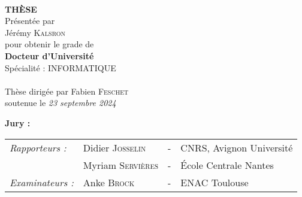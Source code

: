 

\begin{titlepage}
\begin{center}
 \\
\vspace*{0.1cm}
\vspace*{0.1cm}
\vspace*{0.1cm}

\vspace*{0.5cm}
\noindent \Huge \textbf{THÈSE} \\
\vspace*{0.3cm}
\noindent \large {Présentée par\\}
\noindent \LARGE Jérémy \textsc{Kalsron} \\
\vspace*{0.8cm}
\noindent \large {pour obtenir le grade de} \\
\noindent \LARGE \textbf{Docteur d'Université} \\
\vspace*{0.3cm}
\noindent \large {Spécialité : INFORMATIQUE} \\
\vspace*{0.8cm}
 \\
\vspace*{0.8cm}
\noindent \Large Thèse dirigée par Fabien \textsc{Feschet} \\
\vspace*{0.2cm}
\noindent \large soutenue le \textit{23 septembre 2024} \\
\vspace*{0.2cm}
\end{center}
\noindent \large \textbf{Jury :}
\begin{center}
\noindent \large 
\begin{tabular}{llcl}
      \textit{Rapporteurs :}	& Didier \textsc{Josselin}		& - & CNRS, Avignon Université \\
                              & Myriam \textsc{Servières}		& - & École Centrale Nantes \\
      \textit{Examinateurs :} & Anke \textsc{Brock}		      & - & ENAC Toulouse  \\

\end{tabular}
\end{center}
\end{titlepage}
